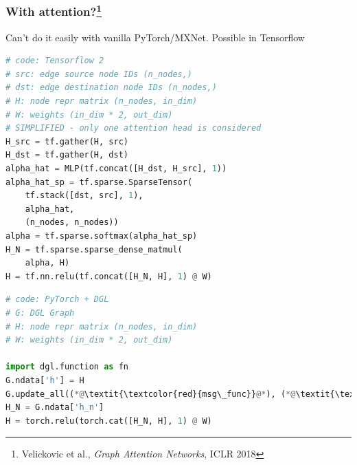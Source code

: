 \documentclass[10pt,aspectratio=169]{beamer}
\begin{document}
	\begin{frame}[fragile]
		\frametitle{With attention?\footnote{Velickovic et al., \emph{Graph Attention Networks}, ICLR 2018}}
		Can't do it easily with vanilla PyTorch/MXNet.  Possible in Tensorflow
		\begin{minipage}{0.5\textwidth}
\begin{lstlisting}[language=Python]
# code: Tensorflow 2
# src: edge source node IDs (n_nodes,)
# dst: edge destination node IDs (n_nodes,)
# H: node repr matrix (n_nodes, in_dim)
# W: weights (in_dim * 2, out_dim)
# SIMPLIFIED - only one attention head is considered
H_src = tf.gather(H, src)
H_dst = tf.gather(H, dst)
alpha_hat = MLP(tf.concat([H_dst, H_src], 1))
alpha_hat_sp = tf.sparse.SparseTensor(
    tf.stack([dst, src], 1),
    alpha_hat,
    (n_nodes, n_nodes))
alpha = tf.sparse.softmax(alpha_hat_sp)
H_N = tf.sparse.sparse_dense_matmul(
    alpha, H)
H = tf.nn.relu(tf.concat([H_N, H], 1) @ W)
\end{lstlisting}
		\end{minipage}%
		\begin{minipage}{0.5\textwidth}
\begin{lstlisting}[language=Python]
# code: PyTorch + DGL
# G: DGL Graph
# H: node repr matrix (n_nodes, in_dim)
# W: weights (in_dim * 2, out_dim)

import dgl.function as fn
G.ndata['h'] = H
G.update_all((*@\textit{\textcolor{red}{msg\_func}}@*), (*@\textit{\textcolor{red}{reduce\_func}}@*))
H_N = G.ndata['h_n']
H = torch.relu(torch.cat([H_N, H], 1) @ W)
\end{lstlisting}
		\end{minipage}
	\end{frame}
\end{document}
